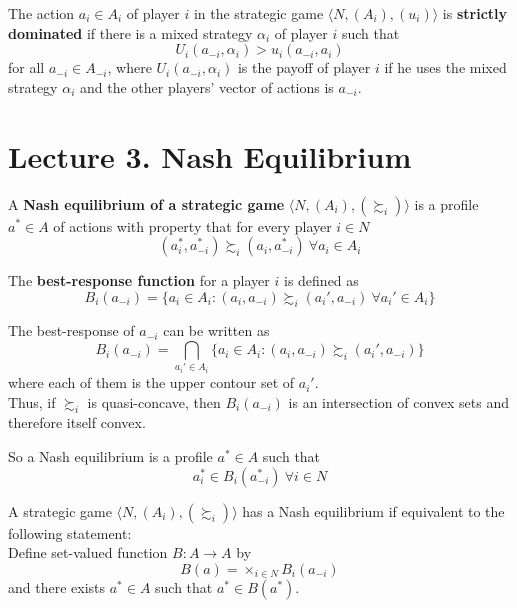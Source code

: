 \documentclass[11pt]{article}
\begin{document}
			\begin{definition}[59.2]
				The action $a_i \in A_i$ of player $i$ in the strategic game $\langle N, (A_i), (u_i) \rangle$ is \textbf{strictly dominated} if there is a mixed strategy $\alpha_i$ of player $i$ such that 
				\[
					U_i(a_{-i}, \alpha_i) > u_i(a_{-i}, a_i)
				\]
				for all $a_{-i} \in A_{-i}$, where $U_i(a_{-i}, \alpha_i)$ is the payoff of player $i$ if he uses the mixed strategy $\alpha_i$ and the other players' vector of actions is $a_{-i}$.
			\end{definition}
		
		
	\section{Lecture 3. Nash Equilibrium}
		\begin{definition}[14.1]
			A \textbf{Nash equilibrium of a strategic game} $\langle N, (A_i), (\succsim_i) \rangle$ is a profile $a^* \in A$ of actions with property that for every player $i \in N$
			\[
				(a_i^*, a^*_{-i}) \succsim_i (a_i, a^*_{-i})\ \forall a_i \in A_i
			\]
		\end{definition}
		
		\begin{definition}[pg.15]
			The \textbf{best-response function} for a player $i$ is defined as
			\[
				B_i(a_{-i}) = \{a_i \in A_i : (a_i, a_{-i}) \succsim_i (a_i', a_{-i})\ \forall a_i' \in A_i \}
			\]
		\end{definition}
		
		\begin{remark}
			The best-response of $a_{-i}$ can be written as 
			\[
				B_i(a_{-i}) = \bigcap_{a_i' \in A_i} \{a_i \in A_i : (a_i, a_{-i}) \succsim_i (a_i', a_{-i})\}
			\]
			where each of them is the upper contour set of $a_i'$. \\
			Thus, if $\succsim_i$ is quasi-concave, then $B_i(a_{-i})$ is an intersection of convex sets and therefore itself convex.
		\end{remark}
		
		\begin{remark}[pg.15]
			So a Nash equilibrium is a profile $a^* \in A$ such that
			\[
				a^*_i \in B_i(a^*_{-i})\ \forall i \in N
			\]
		\end{remark}
		
		\begin{lemma}[pg.19]
			A strategic game $\langle N, (A_i), (\succsim_i) \rangle$ has a Nash equilibrium if equivalent to the following statement:\\
			Define set-valued function $B: A \to A$ by 
			\[
				B(a) = \times_{i\in N} B_i (a_{-i})
			\]
			and there exists $a^* \in A$ such that $a^* \in B(a^*)$.
		\end{lemma}
	
\end{document}
